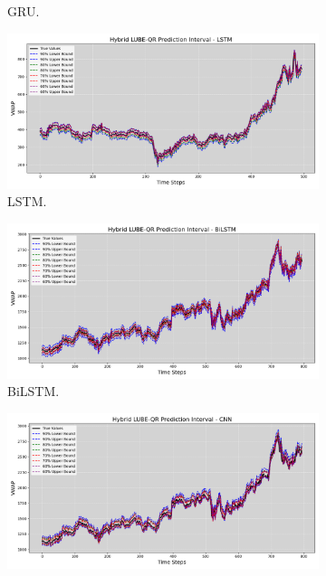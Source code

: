 \begin{figure}[H]
\begin{minipage}{0.49\textwidth}
\begin{subfigure}[b]{\textwidth}
            \caption{GRU.}
        \end{subfigure}
        \begin{subfigure}[b]{\textwidth}
            \centering
            \includegraphics[width=\textwidth]{Chap03/figs/AP_Hybrid_LUBE_QR_AllConfidence_LSTM.png}
            \caption{LSTM.}
        \end{subfigure}
        \caption{Prediction Intervals for Adani Ports dataset obtained using proposed LUBE-QR based Hybrid Method and (a) BiLSTM, (b) CNN, (c) GRU, (d) LSTM Models respectively.}
        \label{fig 5.1}
    \end{minipage}
    \hfill
    \begin{minipage}{0.49\textwidth}
        \centering
        \begin{subfigure}[b]{\textwidth}
            \centering
            \includegraphics[width=\textwidth]{Chap03/figs/AsianPaint_Hybrid_LUBE_QR_AllConfidence_BiLSTM.png}
            \caption{BiLSTM.}
        \end{subfigure}
        \hfill
        \begin{subfigure}[b]{\textwidth}
            \centering
            \includegraphics[width=\textwidth]{Chap03/figs/AsianPaint_Hybrid_LUBE_QR_AllConfidence_CNN.png}

\end{subfigure}
\end{minipage}
\end{figure}
